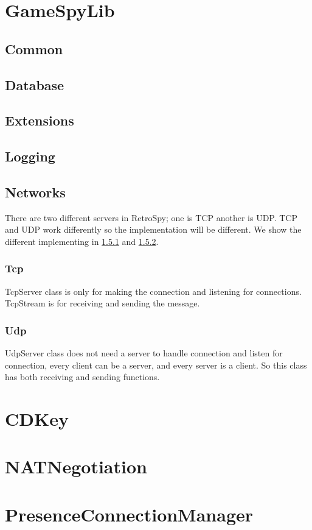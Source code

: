 \documentclass[oneside,titlepage,a4paper]{Definition/retrospy} %
\begin{document}
\section{GameSpyLib}
	\subsection{Common}
	\subsection{Database}
	\subsection{Extensions}
	\subsection{Logging}
	\subsection{Networks}
	There are two different servers in RetroSpy; one is TCP another is UDP.  TCP and UDP work differently so the implementation will be different. We show the different implementing in \ref{Tcp} and \ref{Udp}.
	\subsubsection{Tcp}\label{Tcp}
	TcpServer class is only for making the connection and listening for connections. TcpStream is for receiving and sending the message.
	\subsubsection{Udp}\label{Udp}
	UdpServer class does not need a server to handle connection and listen for connection, every client can be a server, and every server is a client. So this class has both receiving and sending functions.

\section{CDKey}
\section{NATNegotiation}
\section{PresenceConnectionManager}
\end{document}
